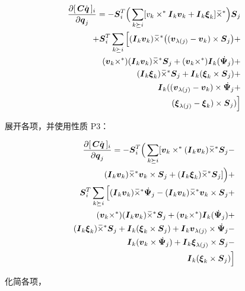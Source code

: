 \documentclass[letterpaper, 10 pt, conference]{ieeetran}  %
\begin{document}
{\begin{enumerate}
   \begin{equation}
      \begin{aligned}
         \frac{\partial  [\,\C \qd\,]_{i}}{\partial \q_{j}} = 
         -\Phibar_{i}^{T} \Big(\sum_{k \succeq i} [v_{k} \times^* \I_{k} \v_{k} +    \I_{k}  \xibar_{k}]  \crff \Big) \Phibar_{j} \\ + \Phibar_{i}^{T}  \sum_{k \succeq i} \Big[  (\I_{k} \v_{k}) \crff     \big( (\v_{\lambda(j)} - \v_{k} )   \times \Phibar_{j} \big ) + \\
         (\v_{k} \times^*) (\I_{k} \v_{k}) \crff \Phibar_{j} +  (\v_{k} \times^*) \I_{k}(\Psibardot_{j})  +   \\
         (\I_{k} \xibar_{k} ) \crff \Phibar_{j} +\I_{k}(\xibar_{k}  \times \Phibar_{j})  + \\
         \I_{k}( (\v_{\lambda(j)} - \v_{k} )  \times  \Psibardot_{j} +\\  ( \xibar_{\lambda(j)} - \xibar_{k} ) \times  \Phibar_{j}) \Big]  
      \end{aligned}
\end{equation}

展开各项，并使用性质 P3：

   \begin{equation}
      \begin{aligned}
         \frac{\partial  [\,\C \qd\,]_{i}}{\partial \q_{j}} = -\Phibar_{i}^{T} \Big(\sum_{k \succeq i} [\v_{k} \times^* (\I_{k} \v_{k}) \crff \Phibar_{j} - \\
         (\I_{k} \v_{k}) \crff \v_{k}\times \Phibar_{j}  +    (\I_{k}  \xibar_{k})\crff \Phibar_{j} ]   \Big)  +   \\ 
         \Phibar_{i}^{T}  \sum_{k \succeq i} \Big[  (\I_{k} \v_{k}) \crff \Psibardot_{j} -   (\I_{k} \v_{k}) \crff \v_{k}\times \Phibar_{j} + \\
         (\v_{k} \times^*) (\I_{k} \v_{k}) \crff \Phibar_{j} + 
         (\v_{k} \times^*) \I_{k}(\Psibardot_{j})  +   \\  (\I_{k} \xibar_{k} ) \crff \Phibar_{j} +\I_{k}(\xibar_{k}  \times \Phibar_{j})  + 
         \I_{k} \v_{\lambda(j)} \times \Psibardot_{j} - \\ \I_{k}( \v_{k} \times \Psibardot_{j})  +
         \I_{k}\xibar_{\lambda(j)} \times \Phibar_{j} - \\
         \I_{k} (\xibar_{k} \times \Phibar_{j}) \Big]  
      \end{aligned}
\end{equation}

化简各项，


\end{enumerate}}
\end{document}
